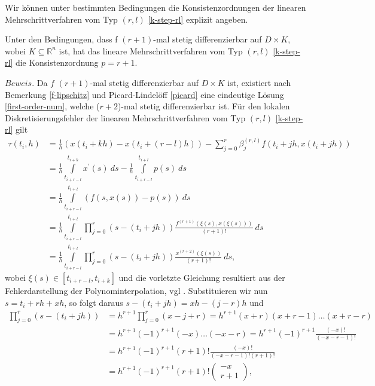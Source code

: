 Wir können unter bestimmten Bedingungen die Konsistenzordnungen der linearen Mehrschrittverfahren vom Typ $(r,l)$
\eqref{k-step-rl} explizit angeben.
\begin{satz}
    Unter den Bedingungen, dass f $(r+1)$-mal stetig differenzierbar auf $D \times K$, wobei $K \subseteq \mathbb{R}^n$ ist, hat
    das lineare Mehrschrittverfahren vom Typ $(r,l)$ \eqref{k-step-rl} die Konsistenzordnung $p=r+1$.
\end{satz}
$Beweis.$ Da $f$ $(r+1)$-mal stetig differenzierbar auf $D \times K$ ist, existiert nach Bemerkung \ref{f-lipschitz} und
Picard-Lindelöff \ref{picard} eine eindeutige Lösung \eqref{first-order-num}, welche ($r+2$)-mal stetig differenzierbar
ist. Für den lokalen Diskretisierungsfehler der linearen Mehrschrittverfahren vom Typ $(r,l)$ \eqref{k-step-rl} gilt
\begin{align*}
    \tau(t_i, h) &= \frac{1}{h} (x(t_i + kh) - x(t_i + (r-l)h)) -
    \sum\limits_{j=0}^{r}\beta_j^{(r,l)}f(t_i+jh, x(t_i +jh))\\
    &= \frac{1}{h} \int\limits_{t_{i+r-l}}^{t_{i+k}} x^{\prime}(s)\ ds -
    \frac{1}{h} \int\limits_{t_{i+r-l}}^{t_{i+l}} p(s)\ ds \\
    &= \frac{1}{h} \int\limits_{t_{i+r-l}}^{t_{i+l}} \left( f(s,x(s)) - p(s) \right)\ ds \\
    &= \frac{1}{h} \int\limits_{t_{i+r-l}}^{t_{i+l}} \prod\limits_{j=0}^{r} (s - (t_i + jh))
    \frac{f^{(r+1)}(\xi(s),x(\xi(s)))}{(r+1)!}\ ds\\
    &= \frac{1}{h} \int\limits_{t_{i+r-l}}^{t_{i+l}} \prod\limits_{j=0}^{r} (s - (t_i + jh))
    \frac{x^{(r+2)}(\xi(s))}{(r+1)!}\ ds,
\end{align*}
wobei $\xi(s) \in [t_{i+r-l}, t_{i+k}]$ und die vorletzte Gleichung resultiert aus der Fehlerdarstellung der
Polynominterpolation, vgl \cite[213]{deuflhardNumerischeMathematik2018}. Substituieren wir nun
$s = t_i + rh + xh$, so folgt daraus $s- (t_i +jh) = xh - (j-r)h$ und
\begin{align*}
    \prod\limits_{j=0}^{r} (s - (t_i +jh)) &= h^{r+1} \prod\limits_{j=0}^{r} (x-j+r) = h^{r+1}(x+r)(x+r-1) \dots (x+r-r)\\
    &= h^{r+1}(-1)^{r+1}(-x)\dots (-x-r) = h^{r+1}(-1)^{r+1}\frac{(-x)!}{(-x-r-1)!}\\
    &= h^{r+1}(-1)^{r+1}(r+1)! \frac{(-x)!}{(-x-r-1)!(r+1)!}\\
&= h^{r+1}(-1)^{r+1}(r+1)! \begin{pmatrix}  -x \\  r+1  \end{pmatrix},
\end{align*}
